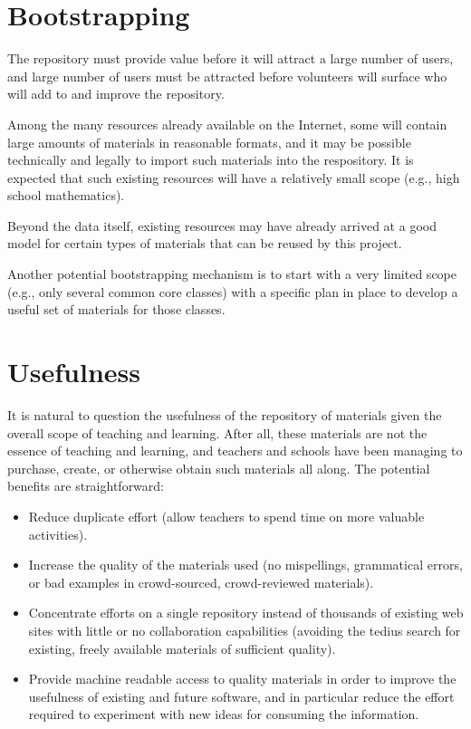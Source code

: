\section*{Bootstrapping}

The repository must provide value before it will attract a large number
of users, and large number of users must be attracted before volunteers
will surface who will add to and improve the repository.

Among the many resources already available on the Internet, some will
contain large amounts of materials in reasonable formats, and it may be
possible technically and legally to import such materials into the
respository.  It is expected that such existing resources will have a
relatively small scope (e.g., high school mathematics).

Beyond the data itself, existing resources may have already arrived at
a good model for certain types of materials that can be reused by this
project.

Another potential bootstrapping mechanism is to start with a very limited
scope (e.g., only several common core classes) with a specific plan in place
to develop a useful set of materials for those classes.

\section*{Usefulness}

It is natural to question the usefulness of the repository of materials
given the overall scope of teaching and learning.  After all, these materials are
not the essence of teaching and learning, and teachers and schools have
been managing to purchase, create, or otherwise obtain such materials all
along.  The potential benefits are straightforward:

\begin{itemize}
\item Reduce duplicate effort (allow teachers to spend time on more valuable activities).
\item Increase the quality of the materials used (no mispellings, grammatical errors,
or bad examples in crowd-sourced, crowd-reviewed materials).
\item Concentrate efforts on a single repository instead of thousands of
existing web sites with little or no collaboration capabilities (avoiding the
tedius search for existing, freely available materials of sufficient quality).
\item Provide machine readable access to quality materials in order to
improve the usefulness of existing and future software, and in particular
reduce the effort required to experiment with new ideas for consuming the
information.

\end{itemize}

